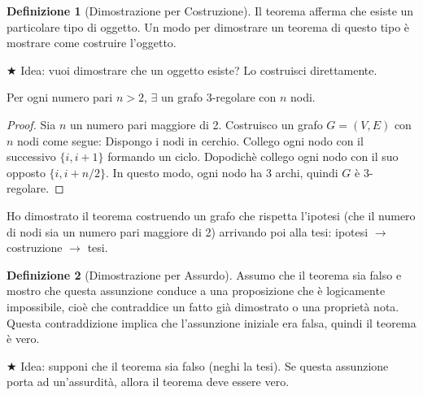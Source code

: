 \documentclass{article}  %
\theoremstyle{definition}
\newtheorem{definition}{Definizione}[section]
\begin{document}
\begin{definition}[Dimostrazione per Costruzione]
	Il teorema afferma che esiste un particolare tipo di oggetto. Un modo per dimostrare un teorema di questo tipo è mostrare come costruire l’oggetto.
\end{definition}
\(\bigstar\) Idea: vuoi dimostrare che un oggetto esiste? Lo costruisci direttamente.


\begin{esempio}[Esempio]
	\footnotesize %
	Per ogni numero pari $n>2$, \(\exists\) un grafo $3$-regolare con $n$ nodi.
	\begin{proof}
		Sia $n$ un numero pari maggiore di 2. Costruisco un grafo \(G=(V,E)\) con $n$ nodi come segue:\newline
		Dispongo i nodi in cerchio. Collego ogni nodo con il successivo \(\{i,i+1\}\) formando un ciclo. Dopodichè collego ogni nodo con il suo opposto \(\{i,i+n/2\}\).
		In questo modo, ogni nodo ha 3 archi, quindi $G$ è $3$-regolare.
	\end{proof}
	Ho dimostrato il teorema costruendo un grafo che rispetta l'ipotesi (che il numero di nodi sia un numero pari maggiore di 2) arrivando poi alla tesi: ipotesi \(\rightarrow\) costruzione \(\rightarrow\) tesi.
\end{esempio}

\begin{definition}[Dimostrazione per Assurdo]
	Assumo che il teorema sia falso e mostro che questa assunzione conduce a una proposizione che è logicamente impossibile, cioè che contraddice un fatto già dimostrato o una proprietà nota. Questa contraddizione implica che l’assunzione iniziale era falsa, quindi il teorema è vero.
\end{definition}
\(\bigstar\) Idea: supponi che il teorema sia falso (neghi la tesi). Se questa assunzione porta ad un'assurdità, allora il teorema deve essere vero.
\end{document}
